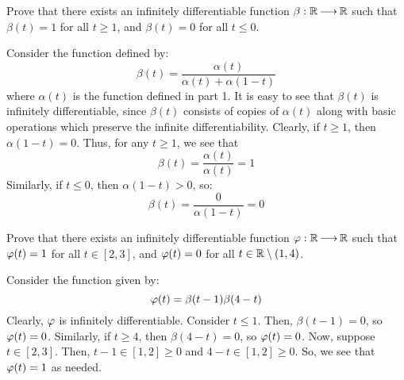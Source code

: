 \begin{qu}[num=4.2]
    Prove that there exists an infinitely differentiable function
    $ \beta: \mathbb{R} \operatorname{\longrightarrow} \mathbb{R} $ such that $ \beta(t) = 1 $ for all
    $ t \geq 1 $, and $ \beta(t) = 0 $ for all $ t \leq 0 $.
\end{qu}

\begin{soln}
    Consider the function defined by:
    \begin{equation*}
        \beta(t) = \frac{\alpha(t)}{\alpha(t) + \alpha(1-t)}
    \end{equation*}
    where $ \alpha(t) $ is the function defined in part 1. \vsp
    It is easy to see that $ \beta(t) $ is infinitely differentiable,
    since $ \beta(t) $ consists of copies of $ \alpha(t) $ along with basic
    operations which preserve the infinite differentiability. \vsp
    Clearly, if $ t \geq 1 $, then $ \alpha(1 - t) = 0 $. Thus, for any
    $ t \geq 1 $, we see that
    \begin{equation*}
        \beta(t) = \frac{\alpha(t)}{\alpha(t)} = 1
    \end{equation*}
    Similarly, if $ t \leq 0 $, then $ \alpha(1 - t) > 0 $, so:
    \begin{equation*}
        \beta(t) = \frac{0}{\alpha(1 - t)} = 0
    \end{equation*}
\end{soln}

\begin{qu}[num=4.3]
    Prove that there exists an infinitely differentiable function
    $ \operatorname{\varphi}: \mathbb{R} \operatorname{\longrightarrow} \mathbb{R} $ such that $ \operatorname{\varphi}(t) = 1 $ for all
    $ t \in [2, 3] $, and $ \operatorname{\varphi}(t) = 0 $ for all $ t \in \mathbb{R} \setminus
    (1, 4) $.
\end{qu}

\begin{soln}
    Consider the function given by:
    \begin{equation*}
        \operatorname{\varphi}(t) = \beta(t - 1)\beta(4 - t)
    \end{equation*}
    Clearly, $ \operatorname{\varphi} $ is infinitely differentiable. \vsp
    Consider $ t \leq 1 $. Then, $ \beta(t - 1) = 0 $, so $ \operatorname{\varphi}(t) = 0 $.
    Similarly, if $ t \geq 4 $, then $ \beta(4 - t) = 0 $, so $ \operatorname{\varphi}(t) = 0 $.
    \vsp
    Now, suppose $ t \in [2, 3] $.
    Then, $ t - 1 \in [1, 2] \geq 0 $ and $ 4 - t \in [1, 2] \geq 0 $.
    So, we see that $ \operatorname{\varphi}(t) = 1 $ as needed.
\end{soln}

